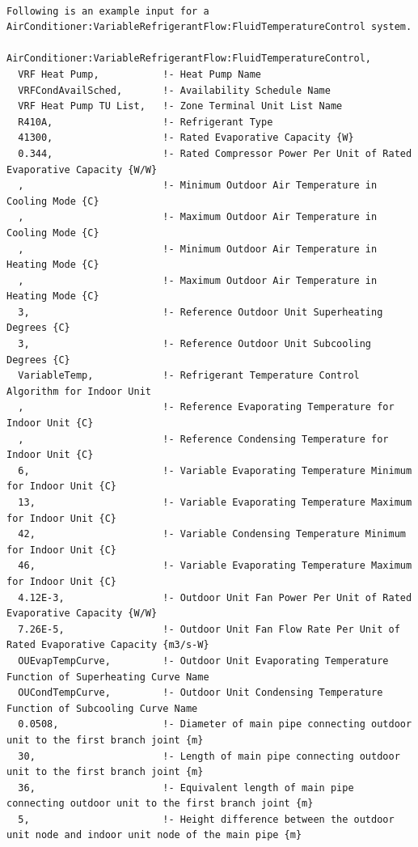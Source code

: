 \begin{lstlisting}

Following is an example input for a AirConditioner:VariableRefrigerantFlow:FluidTemperatureControl system.

AirConditioner:VariableRefrigerantFlow:FluidTemperatureControl,
  VRF Heat Pump,           !- Heat Pump Name
  VRFCondAvailSched,       !- Availability Schedule Name
  VRF Heat Pump TU List,   !- Zone Terminal Unit List Name
  R410A,                   !- Refrigerant Type
  41300,                   !- Rated Evaporative Capacity {W}
  0.344,                   !- Rated Compressor Power Per Unit of Rated Evaporative Capacity {W/W}
  ,                        !- Minimum Outdoor Air Temperature in Cooling Mode {C}
  ,                        !- Maximum Outdoor Air Temperature in Cooling Mode {C}
  ,                        !- Minimum Outdoor Air Temperature in Heating Mode {C}
  ,                        !- Maximum Outdoor Air Temperature in Heating Mode {C}
  3,                       !- Reference Outdoor Unit Superheating Degrees {C}
  3,                       !- Reference Outdoor Unit Subcooling Degrees {C}
  VariableTemp,            !- Refrigerant Temperature Control Algorithm for Indoor Unit
  ,                        !- Reference Evaporating Temperature for Indoor Unit {C}
  ,                        !- Reference Condensing Temperature for Indoor Unit {C}
  6,                       !- Variable Evaporating Temperature Minimum for Indoor Unit {C}
  13,                      !- Variable Evaporating Temperature Maximum for Indoor Unit {C}
  42,                      !- Variable Condensing Temperature Minimum for Indoor Unit {C}
  46,                      !- Variable Evaporating Temperature Maximum for Indoor Unit {C}
  4.12E-3,                 !- Outdoor Unit Fan Power Per Unit of Rated Evaporative Capacity {W/W}
  7.26E-5,                 !- Outdoor Unit Fan Flow Rate Per Unit of Rated Evaporative Capacity {m3/s-W}
  OUEvapTempCurve,         !- Outdoor Unit Evaporating Temperature Function of Superheating Curve Name
  OUCondTempCurve,         !- Outdoor Unit Condensing Temperature Function of Subcooling Curve Name
  0.0508,                  !- Diameter of main pipe connecting outdoor unit to the first branch joint {m}
  30,                      !- Length of main pipe connecting outdoor unit to the first branch joint {m}
  36,                      !- Equivalent length of main pipe connecting outdoor unit to the first branch joint {m}
  5,                       !- Height difference between the outdoor unit node and indoor unit node of the main pipe {m}

\end{lstlisting}
